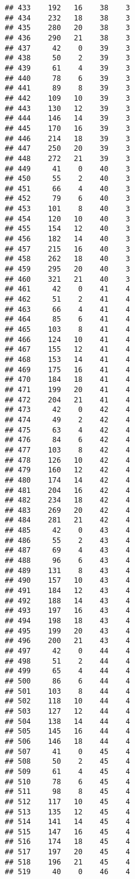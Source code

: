 \documentclass[
]{article}
\begin{document}
\begin{verbatim}
## 433    192   16    38    3
## 434    232   18    38    3
## 435    280   20    38    3
## 436    290   21    38    3
## 437     42    0    39    3
## 438     50    2    39    3
## 439     61    4    39    3
## 440     78    6    39    3
## 441     89    8    39    3
## 442    109   10    39    3
## 443    130   12    39    3
## 444    146   14    39    3
## 445    170   16    39    3
## 446    214   18    39    3
## 447    250   20    39    3
## 448    272   21    39    3
## 449     41    0    40    3
## 450     55    2    40    3
## 451     66    4    40    3
## 452     79    6    40    3
## 453    101    8    40    3
## 454    120   10    40    3
## 455    154   12    40    3
## 456    182   14    40    3
## 457    215   16    40    3
## 458    262   18    40    3
## 459    295   20    40    3
## 460    321   21    40    3
## 461     42    0    41    4
## 462     51    2    41    4
## 463     66    4    41    4
## 464     85    6    41    4
## 465    103    8    41    4
## 466    124   10    41    4
## 467    155   12    41    4
## 468    153   14    41    4
## 469    175   16    41    4
## 470    184   18    41    4
## 471    199   20    41    4
## 472    204   21    41    4
## 473     42    0    42    4
## 474     49    2    42    4
## 475     63    4    42    4
## 476     84    6    42    4
## 477    103    8    42    4
## 478    126   10    42    4
## 479    160   12    42    4
## 480    174   14    42    4
## 481    204   16    42    4
## 482    234   18    42    4
## 483    269   20    42    4
## 484    281   21    42    4
## 485     42    0    43    4
## 486     55    2    43    4
## 487     69    4    43    4
## 488     96    6    43    4
## 489    131    8    43    4
## 490    157   10    43    4
## 491    184   12    43    4
## 492    188   14    43    4
## 493    197   16    43    4
## 494    198   18    43    4
## 495    199   20    43    4
## 496    200   21    43    4
## 497     42    0    44    4
## 498     51    2    44    4
## 499     65    4    44    4
## 500     86    6    44    4
## 501    103    8    44    4
## 502    118   10    44    4
## 503    127   12    44    4
## 504    138   14    44    4
## 505    145   16    44    4
## 506    146   18    44    4
## 507     41    0    45    4
## 508     50    2    45    4
## 509     61    4    45    4
## 510     78    6    45    4
## 511     98    8    45    4
## 512    117   10    45    4
## 513    135   12    45    4
## 514    141   14    45    4
## 515    147   16    45    4
## 516    174   18    45    4
## 517    197   20    45    4
## 518    196   21    45    4
## 519     40    0    46    4

\end{verbatim}
\end{document}
